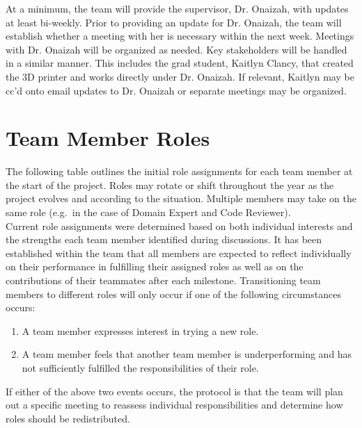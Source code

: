 \documentclass{article}
\begin{document}
At a minimum, the team will provide the supervisor, Dr. Onaizah, with updates at least bi-weekly. Prior to providing
an update for Dr. Onaizah, the team will establish whether a meeting with her is necessary within the next week.
Meetings with Dr. Onaizah will be organized as needed. Key stakeholders will be handled in a similar manner. This
includes the grad student, Kaitlyn Clancy, that created the 3D printer and works directly under Dr. Onaizah. If relevant, Kaitlyn 
may be cc’d onto email updates to Dr. Onaizah or separate meetings may be organized.

\section{Team Member Roles}

The following table outlines the initial role assignments for each team member at the start of the project.
Roles may rotate or shift throughout the year as the project evolves and according to the situation.
Multiple members may take on the same role (e.g.\ in the case of Domain Expert and Code Reviewer).\\

Current role assignments were determined based on both individual interests and the strengths each team member identified during discussions. It has been established within the team that all members are expected to reflect individually on their performance in fulfilling their assigned roles as well as on the contributions of their teammates after each milestone. Transitioning team members to different roles will only occur if one of the following circumstances occurs:

\begin{enumerate}
  \renewcommand{\labelenumi}{(\arabic{enumi})}
  \item A team member expresses interest in trying a new role.
  \item A team member feels that another team member is underperforming and has not sufficiently fulfilled the responsibilities of their role.
\end{enumerate}

If either of the above two events occurs, the protocol is that the team will plan out a specific meeting to reassess individual responsibilities and determine how roles should be redistributed.\\
\end{document}
